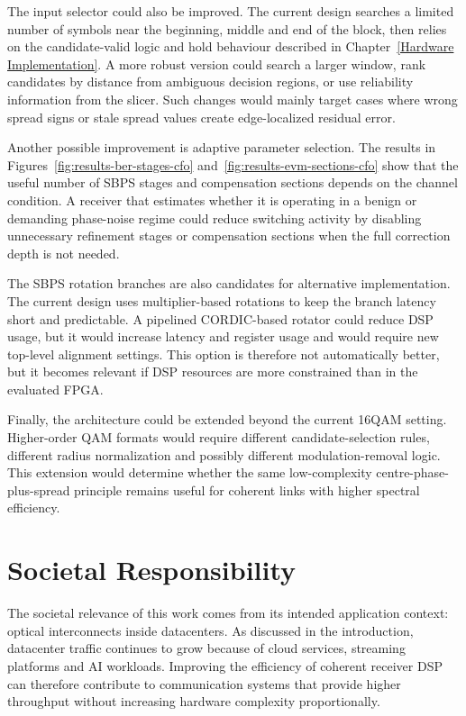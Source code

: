 The input selector could also be improved. The current design searches a limited number of symbols near the beginning, middle and end of the block, then relies on the candidate-valid logic and hold behaviour described in Chapter~\ref{Hardware Implementation}. A more robust version could search a larger window, rank candidates by distance from ambiguous decision regions, or use reliability information from the slicer. Such changes would mainly target cases where wrong spread signs or stale spread values create edge-localized residual error.

Another possible improvement is adaptive parameter selection. The results in Figures~\ref{fig:results-ber-stages-cfo} and~\ref{fig:results-evm-sections-cfo} show that the useful number of \ac{SBPS} stages and compensation sections depends on the channel condition. A receiver that estimates whether it is operating in a benign or demanding phase-noise regime could reduce switching activity by disabling unnecessary refinement stages or compensation sections when the full correction depth is not needed.

The \ac{SBPS} rotation branches are also candidates for alternative implementation. The current design uses multiplier-based rotations to keep the branch latency short and predictable. A pipelined \ac{CORDIC}-based rotator could reduce DSP usage, but it would increase latency and register usage and would require new top-level alignment settings. This option is therefore not automatically better, but it becomes relevant if DSP resources are more constrained than in the evaluated FPGA.

Finally, the architecture could be extended beyond the current \ac{16QAM} setting. Higher-order \ac{QAM} formats would require different candidate-selection rules, different radius normalization and possibly different modulation-removal logic. This extension would determine whether the same low-complexity centre-phase-plus-spread principle remains useful for coherent links with higher spectral efficiency.

\section{Societal Responsibility}

The societal relevance of this work comes from its intended application context: optical interconnects inside datacenters. As discussed in the introduction, datacenter traffic continues to grow because of cloud services, streaming platforms and AI workloads. Improving the efficiency of coherent receiver \ac{DSP} can therefore contribute to communication systems that provide higher throughput without increasing hardware complexity proportionally.

